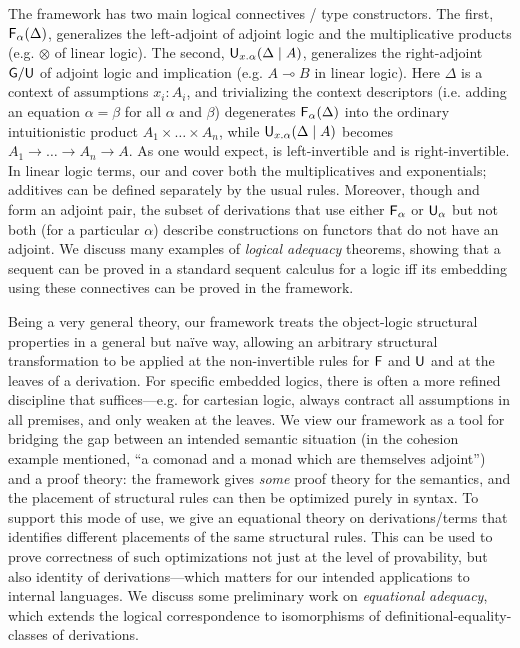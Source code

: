 \documentclass[a4paper,USenglish,numberwithinsect]{lipics-v2016}
\newcommand\F[2]{\ensuremath{\dsd{F}_{#1}(#2)}}
\newcommand\U[3]{\ensuremath{\dsd{U}_{#1}(#2 \mid #3)}}
\newcommand\lolli\multimap
\begin{document}
The framework has two main logical connectives / type constructors.  The
first, \F{\alpha}{\Delta}, generalizes the left-adjoint  of
adjoint logic and the multiplicative products (e.g. $\otimes$ of linear
logic).  The second, \U{x.\alpha}{\Delta}{A}, generalizes the
right-adjoint $\mathsf{G}/\mathsf{U}$ of adjoint logic and implication
(e.g. $A \lolli B$ in linear logic).  Here $\Delta$ is a context of
assumptions $x_i:A_i$, and trivializing the context descriptors
(i.e. adding an equation $\alpha = \beta$ for all $\alpha$ and $\beta$)
degenerates $\F{\alpha}{\Delta}$ into the ordinary intuitionistic
product $A_1 \times \ldots \times A_n$, while \U{x.\alpha}{\Delta}{A}
becomes $A_1 \to \ldots \to A_n \to A$.  As one would expect,  is
left-invertible and  is right-invertible.  In linear logic terms,
our  and  cover both the multiplicatives and exponentials;
additives can be defined separately by the usual rules.  Moreover, though
 and  form an adjoint pair, the subset of derivations that
use either $\mathsf{F}_\alpha$ or $\mathsf{U}_\alpha$ but not both (for a
particular $\alpha$) describe constructions on functors that do not have
an adjoint.  We discuss many examples of \emph{logical adequacy}
theorems, showing that a sequent can be proved in a standard sequent
calculus for a logic iff its embedding using these connectives can be
proved in the framework.

Being a very general theory, our framework treats the object-logic
structural properties in a general but na\"ive way, allowing an
arbitrary structural transformation to be applied at the non-invertible
rules for $\mathsf{F}$ and $\mathsf{U}$ and at the leaves of a derivation.
For specific embedded logics, there is often a more refined discipline
that suffices---e.g. for cartesian logic, always contract all
assumptions in all premises, and only weaken at the leaves.  We view our
framework as a tool for bridging the gap between an intended semantic
situation (in the cohesion example mentioned, ``a comonad and a
monad which are themselves adjoint'') and a proof theory: the framework
gives \emph{some} proof theory for the semantics, and the placement of
structural rules can then be optimized purely in syntax.  To support
this mode of use, we give an equational theory on derivations/terms
that identifies different placements of the same structural rules.  This
can be used to prove correctness of such optimizations not just at the
level of provability, but also identity of derivations---which matters
for our intended applications to internal languages.  We discuss some
preliminary work on \emph{equational adequacy}, which extends the
logical correspondence to isomorphisms of definitional-equality-classes
of derivations.
\end{document}
